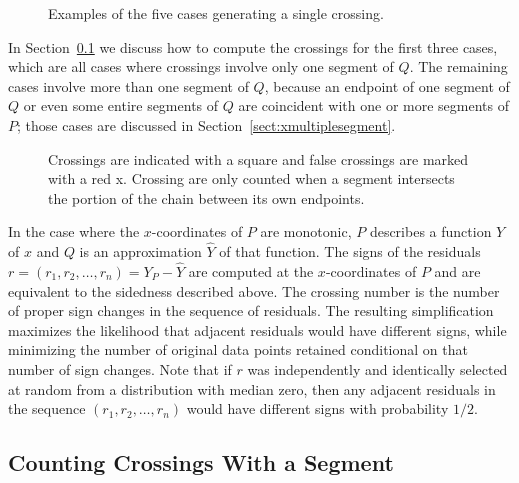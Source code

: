 \documentclass{article}
\begin{document}
\begin{figure}
\caption{Examples of the five cases generating a single crossing.}
\label{fig:cases}
\end{figure}

In Section~\ref{sect:xsingleseg} we discuss how to compute the crossings for the first three
cases, which are all cases where
crossings involve only one segment of $Q$.  The remaining cases involve more
than one segment of $Q$, because an endpoint of one segment of $Q$ or even
some entire segments of $Q$ are coincident with one or more segments of $P$;
those cases are discussed in Section~\ref{sect:xmultiplesegment}.
 	
\begin{figure}
\label{fig}
\qquad
{}
\qquad
{}
\caption{Crossings are indicated with a square and false crossings are
  marked with a red x.  Crossing are only counted when a segment intersects
  the portion of the chain between its own endpoints.}
\end{figure}
	


In the case where the $x$-coordinates of $P$ are monotonic, $P$ describes a
function $Y$ of $x$ and $Q$ is an approximation $\hat{Y}$ of that function.  
The signs of the residuals $r = (r_1,r_2,\ldots,r_n)=Y_P - \hat{Y}$ 
are computed at the $x$-coordinates of $P$ and are equivalent to
the sidedness described above.  The crossing number is the
number of proper sign changes in the sequence of residuals.  The resulting
simplification maximizes the likelihood that adjacent residuals would have
different signs, while minimizing the number of original data points
retained conditional on that number of sign changes.  Note that if $r$ was
independently and identically selected at random from a distribution with
median zero, then any adjacent residuals in the sequence
$(r_1,r_2,\ldots,r_n)$ would have different signs with probability $1/2$.

\subsection{Counting Crossings With a Segment}
\label{sect:xsingleseg}
\end{document}
